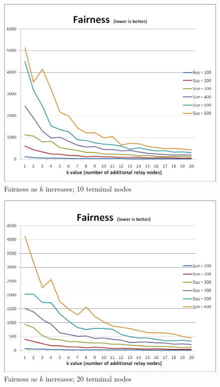 \appendix

\begin{figure}[htp]
\centering
\includegraphics[scale=0.385]{images/2.PNG}
\caption{Fairness as $k$ increases; 10 terminal nodes}
\label{2}
\end{figure}

\begin{figure}[htp]
\centering
\includegraphics[scale=0.385]{images/3.PNG}
\caption{Fairness as $k$ increases; 20 terminal nodes}
\label{3}
\end{figure}

